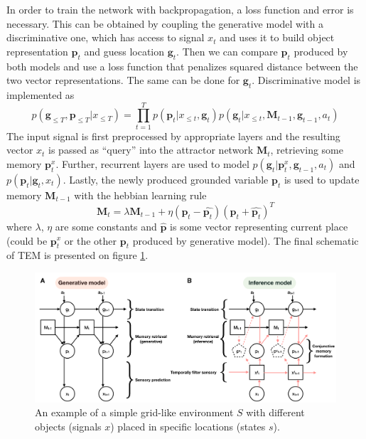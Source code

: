 \documentclass[12pt]{article}
\begin{document}
In order to train the network with backpropagation, a loss function and error is necessary. This can be obtained by coupling the generative model with a discriminative one, which has access to signal $x_{t}$ and uses it to build object representation $\boldsymbol{p}_{t}$ and guess location $\boldsymbol{g}_{t}$. Then we can compare $\boldsymbol{p}_{t}$ produced by both models and use a loss function that penalizes squared distance between the two vector representations. The same can be done for $\boldsymbol{g}_{t}$. Discriminative model is implemented as
\[
p(\boldsymbol{g}_{\le T},\boldsymbol{p}_{\le T}|x_{\le T}) = \prod_{t=1}^T
p(\boldsymbol{p}_t|x_{\le t}, \boldsymbol{g}_{t})
p(\boldsymbol{g}_t|x_{\le t},\boldsymbol{M}_{t-1},\boldsymbol{g}_{t-1},a_t) 
\]
The input signal is first preprocessed by appropriate layers and the resulting vector $x_{t}$ is passed as ``query'' into the attractor network $\boldsymbol{M}_{t}$, retrieving some memory $\boldsymbol{p}^{x}_{t}$. Further, recurrent layers are used to model
$p(\boldsymbol{g}_t|\boldsymbol{p}^{x}_{t},\boldsymbol{g}_{t-1},a_t)$ and $p(\boldsymbol{p}_t|\boldsymbol{g}_t,x_t)$. Lastly, the newly produced grounded variable $\boldsymbol{p}_t$ is used to update memory $\boldsymbol{M}_{t-1}$ with the hebbian learning rule
\[
\boldsymbol{M}_{t} = \lambda \boldsymbol{M}_{t-1} + \eta (\boldsymbol{p}_t - \hat{\boldsymbol{p}_t})(\boldsymbol{p}_t + \hat{\boldsymbol{p}_t})^T
\]
where $\lambda$, $\eta$ are some constants and $\hat{\boldsymbol{p}}$ is some vector representing current place (could be $\boldsymbol{p}^{x}_{t}$ or the other $\boldsymbol{p}_t$ produced by generative model). The final schematic of TEM is presented on figure \ref{fig:tolman_eich}.
\begin{figure}[!htbp]
	\centering
	\includegraphics[width=12cm]{tolman_eich}
	\caption{An example of a simple grid-like environment $S$ with different objects (signals $x$) placed in specific locations (states $s$).}
	\label{fig:tolman_eich}
\end{figure} 
\end{document}
